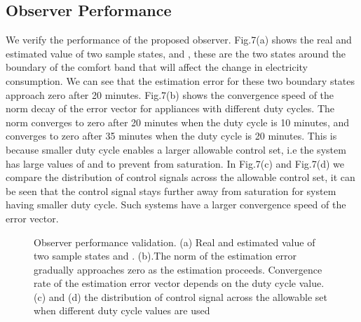 \documentclass[journal]{IEEEtran}
\begin{document}
\subsection{Observer Performance}
We verify the performance of the proposed observer. Fig.7(a) shows the real and estimated value of two sample states,  and , these are the two states around the boundary of the comfort band that will affect the change in electricity consumption. We can see that the estimation error for these two boundary states approach zero after 20 minutes. Fig.7(b) shows the convergence speed of the norm decay of the error vector  for appliances with different duty cycles. The norm converges to zero after 20 minutes when the duty cycle is 10 minutes, and converges to zero after 35 minutes when the duty cycle is 20 minutes. This is because smaller duty cycle enables a larger allowable control set, i.e the system has large values of  and  to prevent from saturation. In Fig.7(c) and Fig.7(d) we compare the distribution of control signals across the allowable control set, it can be seen that the control signal stays further away from saturation for system having smaller duty cycle. Such systems have a larger convergence speed of the error vector. \begin{figure}[hbt]
\centering
{}
\label{observer_result}
\caption{Observer performance validation. (a) Real and estimated value of two sample states  and . (b).The norm of the estimation error gradually approaches zero as the estimation proceeds. Convergence rate of the estimation error vector depends on the duty cycle value. (c) and (d) the distribution of control signal across the allowable set when different duty cycle values are used}
\end{figure}
\end{document}
